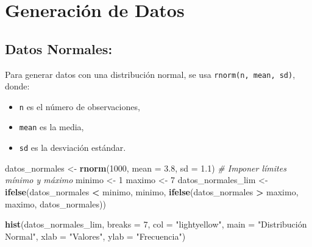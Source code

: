 \documentclass[
]{book}
\newenvironment{Shaded}{\begin{snugshade}}{\end{snugshade}}
\newcommand{\AttributeTok}[1]{\textcolor[rgb]{0.13,0.29,0.53}{#1}}
\newcommand{\CommentTok}[1]{\textcolor[rgb]{0.56,0.35,0.01}{\textit{#1}}}
\newcommand{\DecValTok}[1]{\textcolor[rgb]{0.00,0.00,0.81}{#1}}
\newcommand{\FloatTok}[1]{\textcolor[rgb]{0.00,0.00,0.81}{#1}}
\newcommand{\FunctionTok}[1]{\textcolor[rgb]{0.13,0.29,0.53}{\textbf{#1}}}
\newcommand{\NormalTok}[1]{#1}
\newcommand{\OtherTok}[1]{\textcolor[rgb]{0.56,0.35,0.01}{#1}}
\newcommand{\SpecialCharTok}[1]{\textcolor[rgb]{0.81,0.36,0.00}{\textbf{#1}}}
\newcommand{\StringTok}[1]{\textcolor[rgb]{0.31,0.60,0.02}{#1}}
\providecommand{\tightlist}{%
  \setlength{\itemsep}{0pt}\setlength{\parskip}{0pt}}
\begin{document}
\hypertarget{generaciuxf3n-de-datos}{%
\section{Generación de Datos}\label{generaciuxf3n-de-datos}}

\hypertarget{datos-normales}{%
\subsection{Datos Normales:}\label{datos-normales}}

Para generar datos con una distribución normal, se usa \texttt{rnorm(n,\ mean,\ sd)}, donde:

\begin{itemize}
\tightlist
\item
  \texttt{n} es el número de observaciones,\\
\item
  \texttt{mean} es la media,\\
\item
  \texttt{sd} es la desviación estándar.
\end{itemize}

\begin{Shaded}
\begin{Highlighting}[]
\NormalTok{datos\_normales }\OtherTok{\textless{}{-}} \FunctionTok{rnorm}\NormalTok{(}\DecValTok{1000}\NormalTok{, }\AttributeTok{mean =} \FloatTok{3.8}\NormalTok{, }\AttributeTok{sd =} \FloatTok{1.1}\NormalTok{)}
\CommentTok{\# Imponer límites mínimo y máximo}
\NormalTok{minimo }\OtherTok{\textless{}{-}} \DecValTok{1}
\NormalTok{maximo }\OtherTok{\textless{}{-}} \DecValTok{7}
\NormalTok{datos\_normales\_lim }\OtherTok{\textless{}{-}} \FunctionTok{ifelse}\NormalTok{(datos\_normales }\SpecialCharTok{\textless{}}\NormalTok{ minimo, minimo, }
                         \FunctionTok{ifelse}\NormalTok{(datos\_normales }\SpecialCharTok{\textgreater{}}\NormalTok{ maximo, maximo, datos\_normales))}

\FunctionTok{hist}\NormalTok{(datos\_normales\_lim, }
     \AttributeTok{breaks =} \DecValTok{7}\NormalTok{, }
     \AttributeTok{col =} \StringTok{"lightyellow"}\NormalTok{, }
     \AttributeTok{main =} \StringTok{"Distribución Normal"}\NormalTok{, }
     \AttributeTok{xlab =} \StringTok{"Valores"}\NormalTok{,}
     \AttributeTok{ylab =} \StringTok{"Frecuencia"}\NormalTok{)}
\end{Highlighting}
\end{Shaded}
\end{document}
